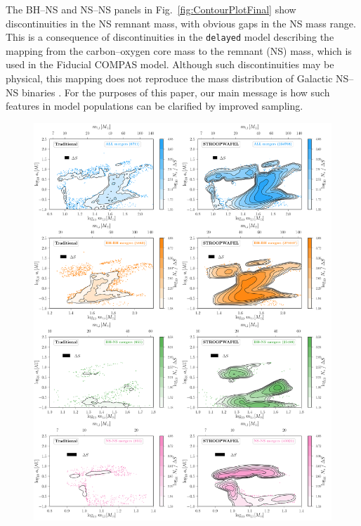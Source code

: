 \documentclass[a4paper,fleqn,usenatbib,useAMS,usedcolumn]{mnras}
\begin{document}
The BH--NS and NS--NS panels in Fig.~\ref{fig:ContourPlotFinal}  show discontinuities in the NS remnant mass, with obvious gaps in the NS mass range. 
This is a consequence of discontinuities in the \texttt{delayed} \citet{2012ApJ...749...91F} model describing the mapping from the carbon--oxygen core mass to the remnant (NS) mass, which is used in the Fiducial COMPAS model. Although such discontinuities may be physical, this mapping does not reproduce the mass distribution of Galactic NS--NS binaries \citep{2018MNRAS.481.4009V}.  For the purposes of this paper, our main message is how such features in model populations can be clarified by improved sampling. 
%
\begin{figure}
	\includegraphics[width=.95\textwidth]{OnlyContourPlotInitialZ0_001.pdf}

\end{figure}
\end{document}
